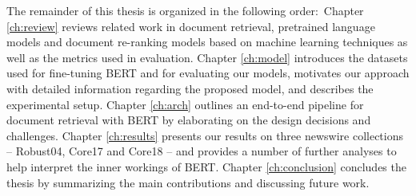 The remainder of this thesis is organized in the following order:\
Chapter \ref{ch:review} reviews related work in document retrieval, pretrained language models and document re-ranking models based on machine learning techniques as well as the metrics used in evaluation.
Chapter \ref{ch:model} introduces the datasets used for fine-tuning BERT and for evaluating our models, motivates our approach with detailed information regarding the proposed model, and describes the experimental setup.
Chapter \ref{ch:arch} outlines an end-to-end pipeline for document retrieval with BERT by elaborating on the design decisions and challenges.
Chapter \ref{ch:results} presents our results on three newswire collections -- Robust04, Core17 and Core18 -- and provides a number of further analyses to help interpret the inner workings of BERT.
Chapter \ref{ch:conclusion} concludes the thesis by summarizing the main contributions and discussing future work.